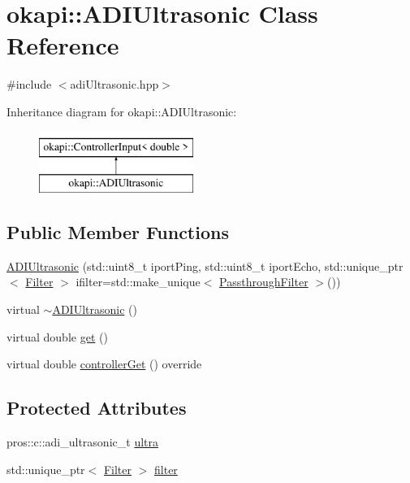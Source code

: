 \hypertarget{classokapi_1_1ADIUltrasonic}{}\section{okapi\+::A\+D\+I\+Ultrasonic Class Reference}
\label{classokapi_1_1ADIUltrasonic}


{\ttfamily \#include $<$adi\+Ultrasonic.\+hpp$>$}

Inheritance diagram for okapi\+::A\+D\+I\+Ultrasonic\+:\begin{figure}[H]
\begin{center}
\leavevmode
\includegraphics[height=2.000000cm]{classokapi_1_1ADIUltrasonic}
\end{center}
\end{figure}
\subsection*{Public Member Functions}
\begin{DoxyCompactItemize}
\item 
\mbox{\hyperlink{classokapi_1_1ADIUltrasonic_aaa0b61d7e4d5657c4f1c6ce4925ee8e4}{A\+D\+I\+Ultrasonic}} (std\+::uint8\+\_\+t iport\+Ping, std\+::uint8\+\_\+t iport\+Echo, std\+::unique\+\_\+ptr$<$ \mbox{\hyperlink{classokapi_1_1Filter}{Filter}} $>$ ifilter=std\+::make\+\_\+unique$<$ \mbox{\hyperlink{classokapi_1_1PassthroughFilter}{Passthrough\+Filter}} $>$())
\item 
virtual \mbox{\hyperlink{classokapi_1_1ADIUltrasonic_abc31760e8928300d152eaeaf3d571341}{$\sim$\+A\+D\+I\+Ultrasonic}} ()
\item 
virtual double \mbox{\hyperlink{classokapi_1_1ADIUltrasonic_ac2447e1f1d415ee48989f9fa9d85560e}{get}} ()
\item 
virtual double \mbox{\hyperlink{classokapi_1_1ADIUltrasonic_a1ba1e2c1b71dba82c762ba941fe811c0}{controller\+Get}} () override
\end{DoxyCompactItemize}
\subsection*{Protected Attributes}
\begin{DoxyCompactItemize}
\item 
pros\+::c\+::adi\+\_\+ultrasonic\+\_\+t \mbox{\hyperlink{classokapi_1_1ADIUltrasonic_ac952316de8cf081e260e8da689dbc66f}{ultra}}
\item 
std\+::unique\+\_\+ptr$<$ \mbox{\hyperlink{classokapi_1_1Filter}{Filter}} $>$ \mbox{\hyperlink{classokapi_1_1ADIUltrasonic_aa2537c5ffc44d18838b0710af72bf338}{filter}}
\end{DoxyCompactItemize}


